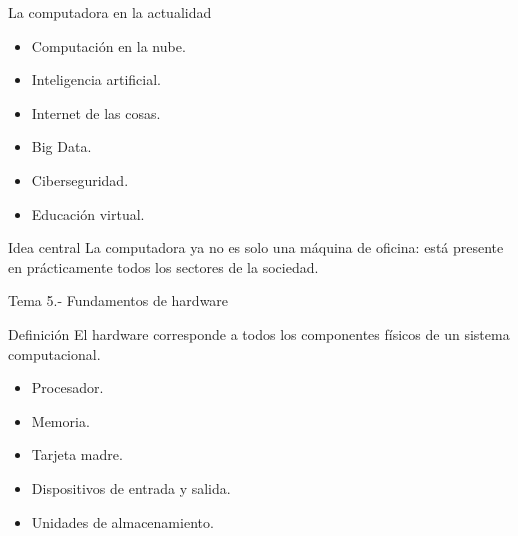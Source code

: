 \documentclass[10pt, aspectratio=169]{beamer}
\begin{document}
	\begin{frame}{La computadora en la actualidad}
		
		\small
		
		\begin{itemize}
			\item Computación en la nube.
			\item Inteligencia artificial.
			\item Internet de las cosas.
			\item Big Data.
			\item Ciberseguridad.
			\item Educación virtual.
		\end{itemize}
		
		\vspace{0.4cm}
		
		\begin{block}{Idea central}
			La computadora ya no es solo una máquina de oficina: está presente en prácticamente todos los sectores de la sociedad.
		\end{block}
		
	\end{frame}
	
	\begin{frame}{Tema 5.- Fundamentos de hardware}
		
		\begin{block}{Definición}
			El hardware corresponde a todos los componentes físicos de un sistema computacional.
		\end{block}
		
		\begin{itemize}
			\item Procesador.
			\item Memoria.
			\item Tarjeta madre.
			\item Dispositivos de entrada y salida.
			\item Unidades de almacenamiento.
		\end{itemize}
		
	\end{frame}
	
\end{document}
